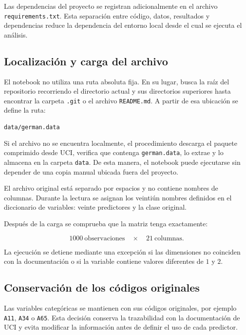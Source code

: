 Las dependencias del proyecto se registran adicionalmente en el archivo
\texttt{requirements.txt}. Esta separación entre código, datos,
resultados y dependencias reduce la dependencia del entorno local desde
el cual se ejecuta el análisis.

\subsection{Localización y carga del archivo}

El notebook no utiliza una ruta absoluta fija. En su lugar, busca la raíz
del repositorio recorriendo el directorio actual y sus directorios
superiores hasta encontrar la carpeta \texttt{.git} o el archivo
\texttt{README.md}. A partir de esa ubicación se define la ruta:

\begin{center}
    \texttt{data/german.data}
\end{center}

Si el archivo no se encuentra localmente, el procedimiento descarga el
paquete comprimido desde UCI, verifica que contenga
\texttt{german.data}, lo extrae y lo almacena en la carpeta
\texttt{data}. De esta manera, el notebook puede ejecutarse sin depender
de una copia manual ubicada fuera del proyecto.

El archivo original está separado por espacios y no contiene nombres de
columnas. Durante la lectura se asignan los veintiún nombres definidos
en el diccionario de variables: veinte predictores y la clase original.

Después de la carga se comprueba que la matriz tenga exactamente:

\[
1000\ \text{observaciones}
\quad \times \quad
21\ \text{columnas}.
\]

La ejecución se detiene mediante una excepción si las dimensiones no
coinciden con la documentación o si la variable
 contiene valores diferentes de \(1\) y \(2\).

\subsection{Conservación de los códigos originales}

Las variables categóricas se mantienen con sus códigos originales, por
ejemplo \texttt{A11}, \texttt{A34} o \texttt{A65}. Esta decisión conserva
la trazabilidad con la documentación de UCI y evita modificar la
información antes de definir el uso de cada predictor.

